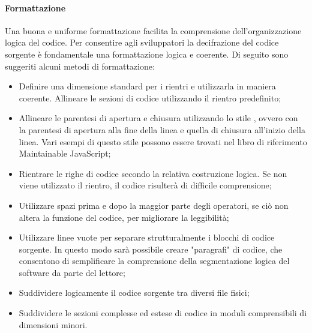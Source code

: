 \documentclass[../NormeDiProgetto.tex]{subfiles}
\begin{document}
                  \paragraph{Formattazione}
                  Una buona e uniforme formattazione facilita la comprensione dell'organizzazione logica del codice. Per consentire agli sviluppatori la decifrazione del codice sorgente è fondamentale una formattazione logica e coerente.
                  Di seguito sono suggeriti alcuni metodi di formattazione:
                  \begin{itemize}
                        \item Definire una dimensione standard per i rientri e utilizzarla in maniera coerente. Allineare le sezioni di codice utilizzando il rientro predefinito;
                        \item Allineare le parentesi di apertura e chiusura utilizzando lo stile , ovvero con la parentesi di apertura alla fine della linea e quella di chiusura all'inizio della linea. Vari esempi di questo stile possono essere trovati nel libro di riferimento Maintainable JavaScript;
                        \item Rientrare le righe di codice secondo la relativa costruzione logica. Se non viene utilizzato il rientro, il codice risulterà di difficile comprensione;
                        \item Utilizzare spazi prima e dopo la maggior parte degli operatori, se ciò non altera la funzione del codice, per migliorare la leggibilità;
                        \item Utilizzare linee vuote per separare strutturalmente i blocchi di codice sorgente. In questo modo sarà possibile creare "paragrafi" di codice, che consentono di semplificare la comprensione della segmentazione logica del software da parte del lettore;
                        \item Suddividere logicamente il codice sorgente tra diversi file fisici;
                        \item Suddividere le sezioni complesse ed estese di codice in moduli comprensibili di dimensioni minori.
                  \end{itemize}
\end{document}
